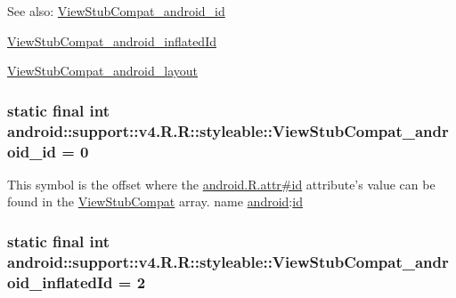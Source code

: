 \begin{Desc}
\item[See also:]\hyperlink{classandroid_1_1support_1_1v4_1_1_r_1_1styleable_38d2168866d2e90ab7678e5f08617eba}{ViewStubCompat\_\-android\_\-id} 

\hyperlink{classandroid_1_1support_1_1v4_1_1_r_1_1styleable_fbb85415ec2416f8cfc401e1532b49ae}{ViewStubCompat\_\-android\_\-inflatedId} 

\hyperlink{classandroid_1_1support_1_1v4_1_1_r_1_1styleable_e4052db577a557ecc97dc5c3f81aabd7}{ViewStubCompat\_\-android\_\-layout} \end{Desc}
\hypertarget{classandroid_1_1support_1_1v4_1_1_r_1_1styleable_38d2168866d2e90ab7678e5f08617eba}{
\subsubsection[{ViewStubCompat\_\-android\_\-id}]{\setlength{\rightskip}{0pt plus 5cm}static final int android::support::v4.R.R::styleable::ViewStubCompat\_\-android\_\-id = 0}}
\label{classandroid_1_1support_1_1v4_1_1_r_1_1styleable_38d2168866d2e90ab7678e5f08617eba}


This symbol is the offset where the \hyperlink{}{android.R.attr\#id} attribute's value can be found in the \hyperlink{classandroid_1_1support_1_1v4_1_1_r_1_1styleable_2b14c683a11161f4740b13eb80af9370}{ViewStubCompat} array.  name \hyperlink{namespaceandroid}{android}:\hyperlink{classandroid_1_1support_1_1v4_1_1_r_1_1id}{id} \hypertarget{classandroid_1_1support_1_1v4_1_1_r_1_1styleable_fbb85415ec2416f8cfc401e1532b49ae}{
\subsubsection[{ViewStubCompat\_\-android\_\-inflatedId}]{\setlength{\rightskip}{0pt plus 5cm}static final int android::support::v4.R.R::styleable::ViewStubCompat\_\-android\_\-inflatedId = 2}}
\label{classandroid_1_1support_1_1v4_1_1_r_1_1styleable_fbb85415ec2416f8cfc401e1532b49ae}


